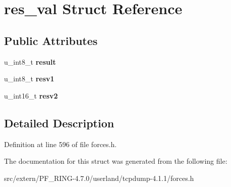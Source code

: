 \hypertarget{structres__val}{
\section{res\_\-val Struct Reference}
\label{structres__val}
}
\subsection*{Public Attributes}
\begin{DoxyCompactItemize}
\item 
\hypertarget{structres__val_a6b5b16ff4b7bcc3995cf479c9305fb87}{
u\_\-int8\_\-t {\bfseries result}}
\label{structres__val_a6b5b16ff4b7bcc3995cf479c9305fb87}

\item 
\hypertarget{structres__val_a4a1f507ca75ee7c471d82609e48afc72}{
u\_\-int8\_\-t {\bfseries resv1}}
\label{structres__val_a4a1f507ca75ee7c471d82609e48afc72}

\item 
\hypertarget{structres__val_a4ba634807b43b7ac7a51da7cb9ef3777}{
u\_\-int16\_\-t {\bfseries resv2}}
\label{structres__val_a4ba634807b43b7ac7a51da7cb9ef3777}

\end{DoxyCompactItemize}


\subsection{Detailed Description}


Definition at line 596 of file forces.h.



The documentation for this struct was generated from the following file:\begin{DoxyCompactItemize}
\item 
src/extern/PF\_\-RING-\/4.7.0/userland/tcpdump-\/4.1.1/forces.h\end{DoxyCompactItemize}
